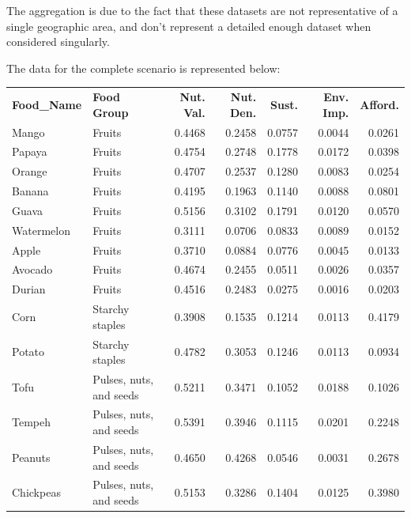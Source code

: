 \documentclass{oqireport}
\begin{document}
The aggregation is due to the fact that these datasets are not representative of a single geographic area, and don't represent a detailed enough dataset when considered singularly.

The data for the complete scenario is represented below:
\begin{table}[ht]
\centering
\scriptsize
\label{tab:food_data}
\begin{tabular}{llrrrrr}

\textbf{Food\_Name} & \textbf{Food Group}      & \textbf{Nut. Val.} & \textbf{Nut. Den.} & \textbf{Sust.} & \textbf{Env. Imp.} & \textbf{Afford.} \\

Mango          & Fruits                & 0.4468 & 0.2458 & 0.0757 & 0.0044 & 0.0261 \\
Papaya         & Fruits                & 0.4754 & 0.2748 & 0.1778 & 0.0172 & 0.0398 \\
Orange         & Fruits                & 0.4707 & 0.2537 & 0.1280 & 0.0083 & 0.0254 \\
Banana         & Fruits                & 0.4195 & 0.1963 & 0.1140 & 0.0088 & 0.0801 \\
Guava          & Fruits                & 0.5156 & 0.3102 & 0.1791 & 0.0120 & 0.0570 \\
Watermelon     & Fruits                & 0.3111 & 0.0706 & 0.0833 & 0.0089 & 0.0152 \\
Apple          & Fruits                & 0.3710 & 0.0884 & 0.0776 & 0.0045 & 0.0133 \\
Avocado        & Fruits                & 0.4674 & 0.2455 & 0.0511 & 0.0026 & 0.0357 \\
Durian         & Fruits                & 0.4516 & 0.2483 & 0.0275 & 0.0016 & 0.0203 \\
Corn           & Starchy staples       & 0.3908 & 0.1535 & 0.1214 & 0.0113 & 0.4179 \\
Potato         & Starchy staples       & 0.4782 & 0.3053 & 0.1246 & 0.0113 & 0.0934 \\
Tofu           & Pulses, nuts, and seeds & 0.5211 & 0.3471 & 0.1052 & 0.0188 & 0.1026 \\
Tempeh         & Pulses, nuts, and seeds & 0.5391 & 0.3946 & 0.1115 & 0.0201 & 0.2248 \\
Peanuts        & Pulses, nuts, and seeds & 0.4650 & 0.4268 & 0.0546 & 0.0031 & 0.2678 \\
Chickpeas      & Pulses, nuts, and seeds & 0.5153 & 0.3286 & 0.1404 & 0.0125 & 0.3980 \\

\end{tabular}
\end{table}
\end{document}
